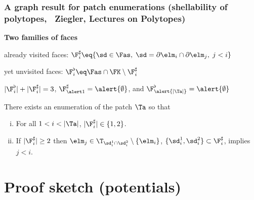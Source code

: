 \documentclass[compress]{beamer}
\begin{document}
\begin{frame}
\frametitle{A graph result for patch enumerations (shellability of polytopes,
\eg\ {\scriptsize Ziegler, Lectures on Polytopes})}

{\bf Two families of faces}

\bi

\item already visited faces: $\F_i^\sharp \eq \{\sd\in\Fas,\; \sd=\partial
\elm_i \cap
\partial \elm_j,\;j<i\}$

\item yet unvisited faces: $\F_i^\flat \eq \Fas \cap \FK \setminus
\F_i^\sharp$

\item $|\F_i^\flat|+|\F_i^\sharp|=3$, $\F_{\alert
1}^\sharp=\alert{\emptyset}$, and $\F_{\alert{
|\Ta|}}^\flat=\alert{\emptyset}$

\ei

\pause

\begin{lemma}
There exists an enumeration of the patch $\Ta$ so that
\begin{enumerate}[(i)]
\item For all $1<i<|\Ta|$, $|\F_i^\sharp|\in\{1,2\}$.
\item If $|\F_i^\sharp|\ge2$ then $\elm_j \in \T_{\sd_i^1\cap
\sd_i^2}\setminus\{\elm_i\}$, $\{\sd_i^1,\sd_i^2\}\subset \F_i^\sharp$,
implies $j< i$.
\end{enumerate}
\end{lemma}

\end{frame}

\section[Proof]{Proof sketch (potentials)}
\end{document}
